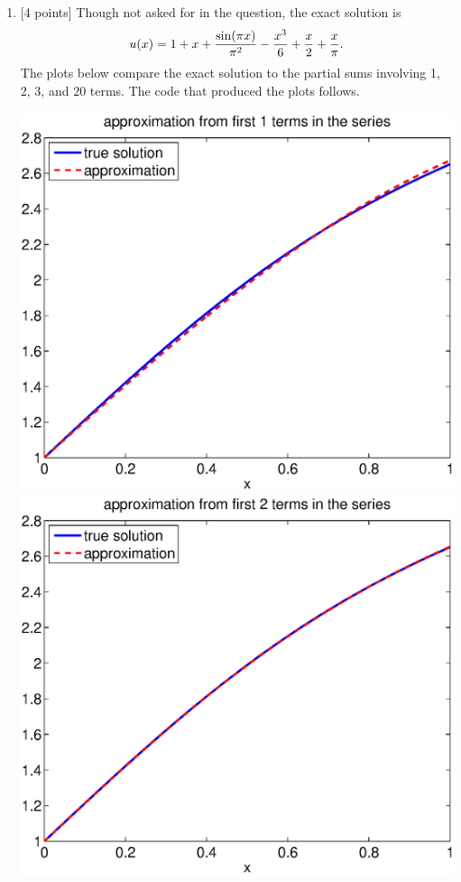 \begin{solution}
\begin{enumerate}
\item {[4 points]} Though not asked for in the question, the exact solution is
\[ u(x) = 1 + x + {\sin(\pi x) \over \pi^2} -{x^3 \over 6} + {x\over 2} + {x\over \pi}.\]
The plots below compare the exact solution to the partial sums involving
1, 2, 3, and 20 terms.  The code that produced the plots follows.
\begin{center}
   \includegraphics[scale=0.4]{bvpsin_1}\quad
   \includegraphics[scale=0.4]{bvpsin_2}


\end{center}
\end{enumerate}
\end{solution}
